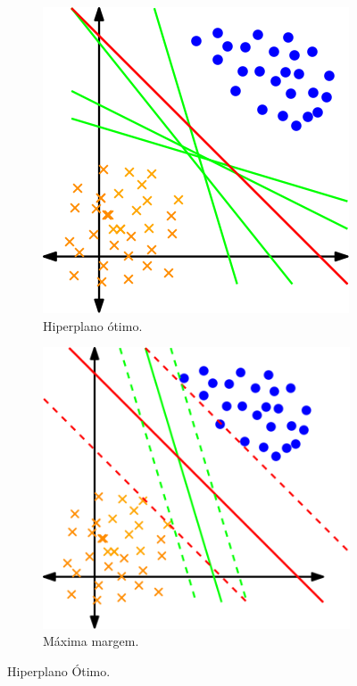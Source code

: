 \documentclass[12pt,a4paper]{scrartcl}
\theoremstyle{definition}%
\begin{document}
\begin{figure}[hbtp] 
	\centering
	\begin{subfigure}[h]{0.38\textwidth}
		\centering
		\includegraphics[width=\textwidth]{hiperplano_otimo}
		\caption{Hiperplano ótimo. \label{fig:dados_e_hiperplano_otimo:hiperplano_otimo}}
	\end{subfigure}
	\begin{subfigure}[h]{0.40\textwidth}
		\centering
		\includegraphics[width=\textwidth]{hiperplano_maxima_margem}
		\caption{Máxima margem. \label{fig:dados_e_hiperplano_otimo:hiperplano_maxima_margem}}	
	\end{subfigure}
\caption{Hiperplano Ótimo. \label{fig:dados_e_hiperplano_otimo}}
\end{figure}
\end{document}
